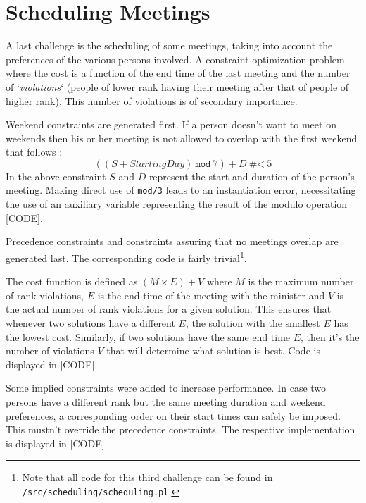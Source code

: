 \section{Scheduling Meetings}

A last challenge is the scheduling of some meetings, taking into account the preferences of the various persons involved. A constraint optimization problem where the cost is a function of the end time of the last meeting and the number of `\textit{violations}` (people of lower rank having their meeting after that of people of higher rank). This number of violations is of secondary importance.\\\par

Weekend constraints are generated first. If a person doesn't want to meet on weekends then his or her meeting is not allowed to overlap with the first weekend that follows :
$$((S + \textit{StartingDay})\ \texttt{mod}\ 7) + D\ \textit{\#<}\ 5$$
In the above constraint $S$ and $D$ represent the start and duration of the person's meeting. Making direct use of \texttt{mod/3} leads to an instantiation error, necessitating the use of an auxiliary variable representing the result of the modulo operation [CODE].\par
Precedence constraints and constraints assuring that no meetings overlap are generated last. The corresponding code is fairly trivial\footnote{Note that all code for this third challenge can be found in \texttt{/src/scheduling/scheduling.pl}.}. \\\par
The cost function is defined as $(M\times E)+V$ where $M$ is the maximum number of rank violations, $E$ is the end time of the meeting with the minister and $V$ is the actual number of rank violations for a given solution. This ensures that whenever two solutions have a different $E$, the solution with the smallest $E$ has the lowest cost. Similarly, if two solutions have the same end time $E$, then it's the number of violations $V$ that will determine what solution is best. Code is displayed in [CODE]. \par
Some implied constraints were added to increase performance. In case two persons have a different rank but the same meeting duration and weekend preferences, a corresponding order on their start times can safely be imposed. This mustn't override the precedence constraints. The respective implementation is displayed in [CODE].\\\par

